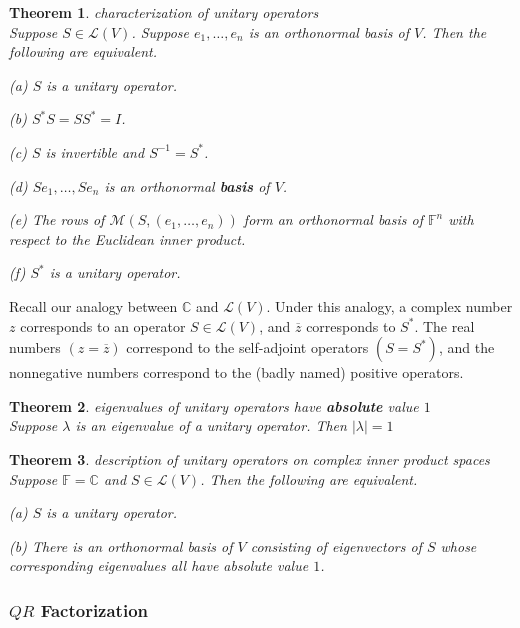 \documentclass{article}
\newtheorem{theorem}{Theorem}[subsection]
\newcommand{\CC}{\mathbb{C}}
\newcommand{\FF}{\mathbb{F}}
\begin{document}
\begin{CJK}{UTF8}{gkai}
\begin{theorem}
    characterization of unitary operators\\

    Suppose $S \in \mathcal{L}(V)$. Suppose $e_1,\ldots,e_n$ is an orthonormal basis of $V$. Then the following are equivalent.

    (a) $S$ is a unitary operator.

    (b) $S^\ast S = SS^\ast  = I$.
    
    (c) $S$ is invertible and $S^{-1} = S^\ast$.

    (d) $Se_1,\ldots,Se_n$ is an orthonormal \textbf{basis} of $V$.
        
    (e) The rows of $\mathcal{M}(S,(e_1,\ldots,e_n))$ form an orthonormal basis of $\FF^n$ with respect to the Euclidean inner product.

    (f) $S^\ast$ is a unitary operator.
\end{theorem}

Recall our analogy between $\CC$ and $\mathcal{L}(V)$. Under this analogy, a complex number $z$ corresponds to an operator $S \in \mathcal{L}(V)$, and $\overline{z}$ corresponds to $S^\ast$. The real numbers $(z = \overline{z})$ correspond to the self-adjoint operators $(S = S^\ast)$, and the nonnegative numbers correspond to the (badly named) positive operators.

\begin{theorem}
    eigenvalues of unitary operators have \textbf{absolute} value $1$\\

    Suppose $\lambda$ is an eigenvalue of a unitary operator. Then $|\lambda| = 1$
\end{theorem}

\begin{theorem}
    description of unitary operators on complex inner product spaces\\

    Suppose $\FF = \CC$ and $S \in \mathcal{L}(V)$. Then the following are equivalent.

    (a) $S$ is a unitary operator.

    (b) There is an orthonormal basis of $V$ consisting of eigenvectors of $S$ whose corresponding eigenvalues all have absolute value $1$.
\end{theorem}
\subsubsection{$QR$ Factorization}


\end{CJK}
\end{document}
